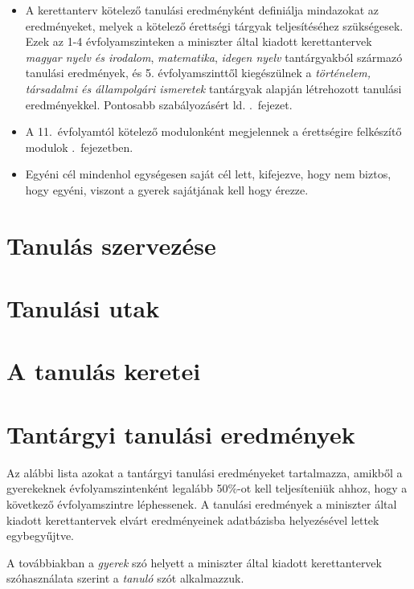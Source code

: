 \documentclass[magyar,12pt,a4paper,oneside,draf]{report}
\begin{document}
\begin{itemize}
    \item A kerettanterv kötelező tanulási eredményként definiálja mindazokat
          az
          eredményeket, melyek a kötelező érettségi tárgyak teljesítéséhez
          szükségesek. Ezek az 1-4 évfolyamszinteken a miniszter által kiadott
          kerettantervek
          \emph{magyar nyelv és irodalom}, \emph{matematika}, \emph{idegen
              nyelv}
          tantárgyakból
          származó tanulási eredmények, és 5. évfolyamszinttől kiegészülnek a
          \emph{történelem, társadalmi és állampolgári ismeretek} tantárgyak
          alapján
          létrehozott tanulási eredményekkel. Pontosabb szabályozásért ld.
          .~fejezet.
    \item A 11.~évfolyamtól kötelező modulonként megjelennek a érettségire
          felkészítő
          modulok .~fejezetben.
      

    \item  Egyéni cél mindenhol egységesen saját cél lett, kifejezve, hogy nem
          biztos, hogy egyéni, viszont a gyerek sajátjának kell hogy érezze.
\end{itemize}
\newpage


\chapter{Tanulás szervezése}


\chapter{Tanulási utak}


\chapter{A tanulás keretei}


\chapter{Tantárgyi tanulási eredmények}
\label{sec:tantargyi_tanulasi_eredmenyek}
Az alábbi lista azokat a tantárgyi tanulási eredményeket tartalmazza, amikből a
gyerekeknek évfolyamszintenként legalább 50\%-ot kell teljesíteniük ahhoz, hogy
a következő évfolyamszintre léphessenek.
A tanulási eredmények a miniszter
által kiadott kerettantervek\cite{ofi:kerettanterv}  elvárt eredményeinek
adatbázisba
helyezésével lettek egybegyűjtve.

A továbbiakban a \emph{gyerek} szó helyett a miniszter által kiadott
kerettantervek szóhasználata szerint a \emph{tanuló} szót alkalmazzuk.


{}
\label{sec:bibliographyk}

\end{document}
